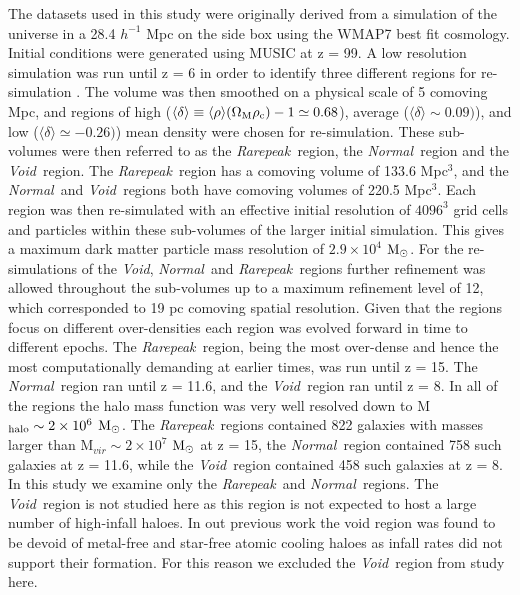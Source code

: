 \documentclass[graphics, twocolumn, usenatbib]{mn2e}
\newcommand{\mpch} {\rm $h^{-1}$ Mpc\,\,}
\newcommand{\msolar} {$\rm{M_{\odot}}~$}
\newcommand{\msolarc} {$\rm{M_{\odot}}$}
\newcommand{\rarepeak} {\textit{Rarepeak~}}
\newcommand{\normal} {\textit{Normal~}}
\newcommand{\void} {\textit{Void~}}
\newcommand{\voidc} {\textit{Void}}
\begin{document}
The datasets used in this study were originally derived from a simulation of the universe in a 28.4
\mpch on the side box using the WMAP7 best fit cosmology. Initial conditions were generated using
MUSIC \citep{Hahn_2011} at z = 99. A low resolution simulation was run until z = 6 in order to
identify three different regions for re-simulation \citep{Chen_2014}. The volume was then smoothed
on a physical scale of 5 comoving Mpc, and regions of high
($\langle\delta\rangle \equiv \langle\rho\rangle(\Omega_{\rm M} \rho_{\rm c}) - 1 \simeq 0.68$),
average ($\langle\delta\rangle \sim 0.09)$), and low ($\langle\delta\rangle \simeq -0.26)$)
mean density were chosen for re-simulation. These sub-volumes were then referred to as the
\rarepeak region, the \normal region  and the \void region. The \rarepeak region has a comoving
volume of 133.6 Mpc$^3$, and the \normal and \void regions both have comoving volumes of 220.5
Mpc$^3$. Each region was then re-simulated with an effective initial resolution of $4096^3$ grid
cells and particles within these sub-volumes of the larger initial simulation. This gives a maximum
dark matter particle mass resolution of $2.9 \times 10^4$ \msolarc. For the re-simulations of the
\voidc, \normal and \rarepeak regions further refinement was allowed throughout the sub-volumes up
to a maximum refinement level of 12, which corresponded to 19 pc comoving spatial resolution. Given
that the regions focus on different over-densities each region was evolved forward in time to
different epochs. The \rarepeak region, being the most over-dense and hence the most
computationally demanding at earlier times, was run until z = 15. The \normal region ran until z =
11.6, and the \void region ran until z = 8. In all of the regions the halo mass function was very
well resolved down to M$_{\rm halo} \sim 2 \times 10^6$ \msolarc. The \rarepeak regions contained
822 galaxies with masses larger than M$_{vir} \sim 2 \times 10^7$ \msolar at z = 15, the \normal region contained 758
such galaxies at z = 11.6, while the \void region contained 458 such galaxies at z = 8.
In this study we examine only the \rarepeak and \normal regions. The 
\void region is not studied here as this region is not expected to 
host a large number of high-infall haloes. In out previous work
\citep{Wise_2019, Regan_2019} the void region was found to be devoid of metal-free and star-free atomic cooling haloes as infall rates
did not support their formation. For this reason we excluded the 
\void region from study here. 
\end{document}
